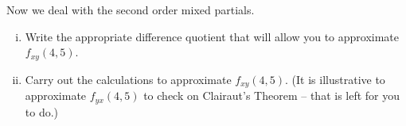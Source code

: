 \begin{activity}
    \item Now we deal with the second order mixed partials.
        \begin{enumerate}[i.]
        \item Write the appropriate difference quotient that will allow you to approximate $f_{xy}(4,5)$.



        \item Carry out the calculations to approximate $f_{xy}(4,5)$. (It is illustrative to approximate $f_{yx}(4,5)$ to check on Clairaut's
            Theorem -- that is left for you to do.)



        \end{enumerate}

    \ea

\end{activity}
\begin{smallhint}

\end{smallhint}
\begin{bighint}

\end{bighint}
